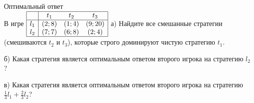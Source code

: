 \begin{problem}
 Оптимальный ответ\\
В игре
$\begin{array}{|c|ccc|}
\hline
{} & {t_{1} } & {t_{2} } & {t_{3} } \\
\hline
{l_{1} } & {\left(2;8\right)} & {\left(1;4\right)} & {\left(9;20\right)} \\ {l_{2} } & {\left(7;7\right)} & {\left(6;8\right)} & {\left(2;4\right)} \\  \hline
\end{array}$
а) Найдите все смешанные стратегии (смешиваются  $t_{2}$  и  $t_{3}$), которые строго доминируют чистую стратегию  $t_{1}$.\par
б) Какая стратегия является оптимальным ответом второго игрока на стратегию  $l_{2} $ ?\par
в) Какая стратегия является оптимальным ответом второго игрока на стратегию  $\frac{1}{3} l_{1} +\frac{2}{3} l_{2}$?\par



\begin{sol}

\end{sol}
\end{problem}



